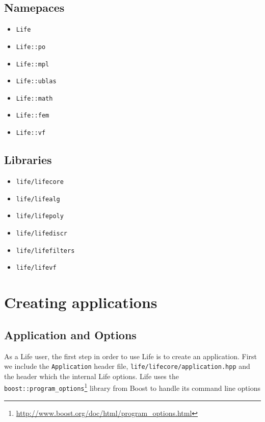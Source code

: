 \documentclass[11pt]{article}
\begin{document}
\subsection{Namepaces}

\begin{itemize}
\item \lstinline!Life!
\item \lstinline!Life::po!
\item \lstinline!Life::mpl!
\item \lstinline!Life::ublas!
\item \lstinline!Life::math!
\item \lstinline!Life::fem!
\item \lstinline!Life::vf!

\end{itemize}

\subsection{Libraries}

\begin{itemize}
\item \lstinline!life/lifecore!
\item \lstinline!life/lifealg!
\item \lstinline!life/lifepoly!
\item \lstinline!life/lifediscr!
\item \lstinline!life/lifefilters!
\item \lstinline!life/lifevf!
\end{itemize}

\section{Creating applications}
\label{sec:creat-appl}



\subsection{Application and Options}
\label{sec:options}

As a Life user, the first step in order to use Life is to create an
application. First we include the \lstinline!Application! header file,
\lstinline!life/lifecore/application.hpp! and the header which the
internal Life options. Life uses the
\lstinline!boost::program_options!\footnote{\url{http://www.boost.org/doc/html/program_options.html}}
library from Boost to handle its command line options
\end{document}
